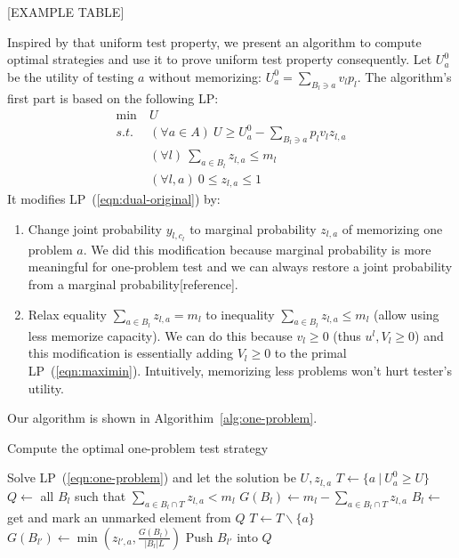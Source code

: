 \documentclass{article}
\begin{document}
[EXAMPLE TABLE]

Inspired by that uniform test property, we present an algorithm to compute
optimal strategies and use it to prove uniform test property consequently.  Let
$U^0_a$ be the utility of testing $a$ without memorizing: $U^0_a =
\sum_{B_l \ni a} v_l p_l$. The algorithm's first part is based on
the following LP:
\begin{align}\label{eqn:one-problem}
	\min~ &U\\
	s.t.~ &(\forall a \in A)~ U \geq U^0_a - \sum_{B_l \ni a} p_l v_l z_{l, a}\nonumber\\
	&(\forall l)~ \sum_{a \in B_l} z_{l, a} \leq m_l\nonumber\\
	&(\forall l, a)~ 0 \leq z_{l, a} \leq 1\nonumber
\end{align}
It modifies LP~(\ref{eqn:dual-original}) by:
\begin{enumerate}
	\item Change joint probability $y_{l, c_l}$ to marginal probability
	$z_{l, a}$ of memorizing one problem $a$.  We did this modification
	because marginal probability is more meaningful for one-problem test
	and we can always restore a joint probability from a marginal
	probability[reference].
	\item Relax equality $\sum_{a \in B_l} z_{l, a} = m_l$ to inequality
	$\sum_{a \in B_l} z_{l,a} \leq m_l$ (allow using less memorize
	capacity).  We can do this because $v_l \geq 0$ (thus $u^l, V_l \geq
	0$) and this modification is essentially adding $V_l \geq 0$ to the
	primal LP~(\ref{eqn:maximin}). Intuitively, memorizing less problems
	won't hurt tester's utility.
\end{enumerate}

Our algorithm is shown in Algorithim~\ref{alg:one-problem}.

\begin{algorithm}
\caption{Compute the optimal one-problem test strategy}\label{alg:one-problem}
\begin{algorithmic}[1]
	\State Solve LP~(\ref{eqn:one-problem}) and let the solution be $U, z_{l,a}$
	\State $T \gets \{a ~|~ U^0_a \geq U\}$
	\State $Q \gets $ all $B_l$ such that $\sum_{a \in B_l \cap T} z_{l,a} < m_l$
	 
		\State $G(B_l) \gets m_l-\sum_{a \in B_l \cap T} z_{l,a}$ \label{line:first-potential}
	\EndFor
		\State $B_l \gets $ get and mark an unmarked element from $Q$
			\State $T \gets T \backslash \{a\}$\label{line:delete-a}
				\State $G(B_{l'}) \gets \min(z_{l',a}, \frac{G(B_l)}{|B_l|L})$\label{line:second-potential}
				\State Push $B_{l'}$ into $Q$\label{line:second-push}
			\EndFor
		\EndFor
	\EndWhile
	\State {}
\EndFunction
\end{algorithmic}
\end{algorithm}
\end{document}

